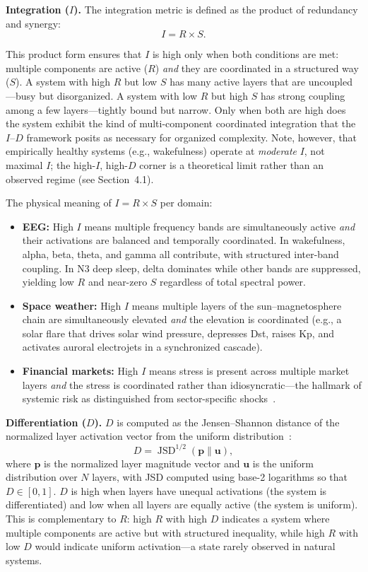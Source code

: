 \documentclass[aip,cha,reprint,amsmath,amssymb,final]{revtex4-2}
\begin{document}
\textbf{Integration ($I$).} The integration metric is defined as the product of redundancy and synergy:
\begin{equation}
I = R \times S.
\end{equation}

This product form ensures that $I$ is high only when both conditions are met: multiple components are active ($R$) \emph{and} they are coordinated in a structured way ($S$). A system with high $R$ but low $S$ has many active layers that are uncoupled---busy but disorganized. A system with low $R$ but high $S$ has strong coupling among a few layers---tightly bound but narrow. Only when both are high does the system exhibit the kind of multi-component coordinated integration that the $I$--$D$ framework posits as necessary for organized complexity. Note, however, that empirically healthy systems (e.g., wakefulness) operate at \emph{moderate} $I$, not maximal $I$; the high-$I$, high-$D$ corner is a theoretical limit rather than an observed regime (see Section~4.1).

The physical meaning of $I = R \times S$ per domain:
\begin{itemize}
\item \textbf{EEG:} High $I$ means multiple frequency bands are simultaneously active \emph{and} their activations are balanced and temporally coordinated. In wakefulness, alpha, beta, theta, and gamma all contribute, with structured inter-band coupling. In N3 deep sleep, delta dominates while other bands are suppressed, yielding low $R$ and near-zero $S$ regardless of total spectral power.
\item \textbf{Space weather:} High $I$ means multiple layers of the sun--magnetosphere chain are simultaneously elevated \emph{and} the elevation is coordinated (e.g., a solar flare that drives solar wind pressure, depresses Dst, raises Kp, and activates auroral electrojets in a synchronized cascade).
\item \textbf{Financial markets:} High $I$ means stress is present across multiple market layers \emph{and} the stress is coordinated rather than idiosyncratic---the hallmark of systemic risk as distinguished from sector-specific shocks~\cite{forbes2002}.
\end{itemize}

\textbf{Differentiation ($D$).} $D$ is computed as the Jensen--Shannon distance of the normalized layer activation vector from the uniform distribution~\cite{lin1991,endres2003}:
\begin{equation}
D = \operatorname{JSD}^{1/2}\left(\mathbf{p} \| \mathbf{u}\right),
\end{equation}
where $\mathbf{p}$ is the normalized layer magnitude vector and $\mathbf{u}$ is the uniform distribution over $N$ layers, with JSD computed using base-2 logarithms so that $D \in [0, 1]$. $D$ is high when layers have unequal activations (the system is differentiated) and low when all layers are equally active (the system is uniform). This is complementary to $R$: high $R$ with high $D$ indicates a system where multiple components are active but with structured inequality, while high $R$ with low $D$ would indicate uniform activation---a state rarely observed in natural systems.
\end{document}
